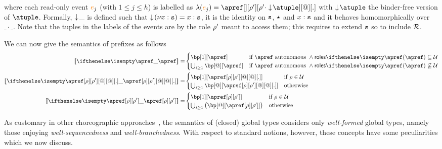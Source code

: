 where each read-only event ${\color{orange}{e}}_j$ (with $1 \leq j \leq h$) is labelled as  
$\alf (\ae_j) = \apref[][\arole'][\arole' \cdot \eraseB\atuple][@][.]$  
%
%
with 
$\eraseB\atuple$ the binder-free version of $\atuple$. 
Formally, $\downarrow\!{\_}$ is defined  such that 
$\downarrow\!{(\nu x:\mathtt{s})} = x : \mathtt{s}$,  it is the identity on $\mathtt{s}$, $\star$ and $x : \mathtt{s}$ and it behaves 
homomorphically over $\_\cdot\_$. 
%
Note that the tuples in the labels of the events are  by the 
role $\rho'$ meant to access  them; this requires to extend $\mathtt{s}$ so to
include  $\mathcal{R}$.



We can now give the semantics of prefixes as follows
\begin{align*}
  \ksem{\apref} =
  &
    \begin{cases}
      \bp[1][\apref]
      & \text{if $\apref$ autonomous } \land \roles{\apref} \subseteq \participants
      \\
      \bigcup_{i \geq 1}\bp[@][\apref]
      & \text{if $\apref$ autonomous } \land \roles{\apref} \not\subseteq \participants
    \end{cases}
  \\
  \ksem{\apref[\arole][\arole'][@][@][.]} =
  &
    \begin{cases}
      \bp[1][{\apref[\arole][\arole'][@][@][.]}]
      & \text{if } \arole \in \participants
      \\
      \bigcup_{i \geq 1}\bp[@][{\apref[\arole][\arole'][@][@][.]}]
      & \text{otherwise}
    \end{cases}
  \\
  \ksem{\apref[\arole][\arole']} =
  &
    \begin{cases}
      \bp[1][{\apref[\arole][\arole']}]
      & \text{if } \arole \in \participants
      \\
      \bigcup_{i \geq 1}\big(\bp[@][{\apref[\arole][\arole']}]\big)
      & \text{otherwise}
    \end{cases}
\end{align*}

As customary in other
choreographic approaches~\cite{},  the semantics of (closed) global types
considers only  \emph{well-formed} global
types, namely those enjoying \emph{well-sequencedness} and
\emph{well-branchedness}.
%
With respect to standard notions, however, these concepts have some
peculiarities which we now discuss.

